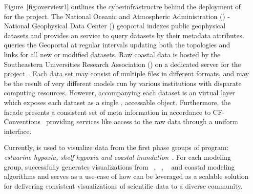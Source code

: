Figure~\ref{fig:overview1} outlines the cyberinfrastructre behind the
deployment of \sciwms{} for the \comt{} project. The National Oceanic
and Atmospheric Administration (\noaa{}) - National Geophysical Data
Center (\ngdc{}) geoportal indexes public geophysical datasets and
provides an \ogc{} \csw{} service to query datasets by their metadata
attributes. \sciwms{} queries the \ngdc{} Geoportal at regular
intervals updating both the topologies and
\opendap{}~\cite{Cornillon03} links for all new or modified datasets.
Raw coastal data is hosted by the Southeastern Universities Research
Association (\sura{}) on a dedicated server for the \comt{}
project~\cite{luettich12}. Each data set may consist of multiple files
in different formats, and may be the result of very different models
run by various institutions with disparate computing
resources. However, accompanying each dataset is an \ncml{} virtual
layer which exposes each dataset as a single \netcdf{}, \opendap{}
accessable object. Furthermore, the \ncml{} facade presents a
consistent set of meta information in accordance to
CF-Conventions~\cite{cf} providing services like \sciwms{} access to
the raw data through a uniform interface.

Currently, \Sciwms{} is used to visualize data from the first phase
groups of \ioos{} \comt{} program: {\em estuarine hypoxia, shelf
  hypoxia and coastal inundation}~\cite{luettich13}. For each modeling
group, \sciwms{} successfully generates visualizations from
\adcirc{}~\cite{adcirc}, \fvcom{}~\cite{chen06}, \selfe{}~\cite{zhang08} and \slosh{} coastal
modeling algorithms and serves as a use-case of how \sciwms{} can be
leveraged as a scalable solution for delivering consistent
visualizations of scientific data to a diverse community.
